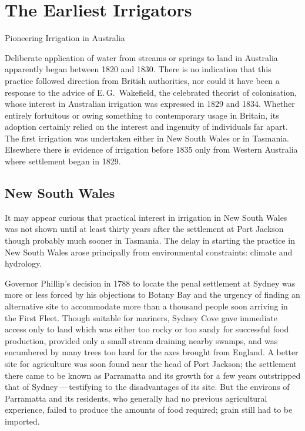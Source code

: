 
\setcounter{endnote}{0}

\chapter{The Earliest Irrigators}
\label{ch:early}
{Pioneering Irrigation in Australia}

Deliberate application of water from streams or springs to land in
Australia apparently began between 1820 and 1830.  There is no
indication that this practice followed direction from British
authorities, nor could it have been a response to the advice of
E.\,G.~Wakefield, the celebrated theorist of
colonisation, whose interest in Australian irrigation was expressed in
1829 and 1834.  Whether entirely fortuitous or owing something to
contemporary usage in Britain, its adoption certainly relied on the
interest and ingenuity of individuals far apart.  The first irrigation
was undertaken either in New South Wales or in Tasmania.  Elsewhere
there is evidence of irrigation before 1835 only from Western
Australia where settlement began in 1829.

\section*{\textsf{New South Wales}}
\label{sec:nsw}

It may appear curious that practical interest in irrigation in New
South Wales was not shown until at least thirty years after the
settlement at Port Jackson though probably much sooner in Tasmania.
The delay in starting the practice in New South Wales arose
principally from environmental constraints: climate and hydrology.

Governor Phillip's decision in 1788 to locate
the penal settlement at Sydney was more or less forced
by his objections to Botany Bay and the urgency of
finding an alternative site to accommodate more than a thousand people
soon arriving in the First Fleet.  Though suitable for mariners,
Sydney Cove gave immediate access only to land which was either too
rocky or too sandy for successful food production, provided only a
small stream draining nearby swamps, and was encumbered by many trees
too hard for the axes brought from England.  A better site for
agriculture was soon found near the head of Port Jackson; the settlement there came to be known as Parramatta
 and its growth for a few years outstripped that
of Sydney\,---\,testifying to the disadvantages of its site.  But the
environs of Parramatta and its residents, who generally had no
previous agricultural experience, failed to produce the amounts of
food required; grain still had to be imported.

